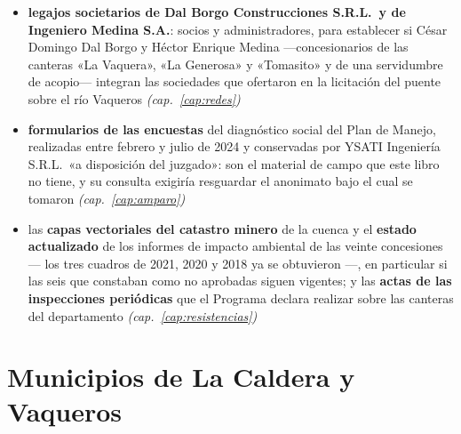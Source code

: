 \begin{itemize}[leftmargin=*]
\item \textbf{legajos societarios de Dal Borgo Construcciones S.R.L.\ y de Ingeniero Medina S.A.}: socios y administradores, para establecer si César Domingo Dal Borgo y Héctor Enrique Medina ---concesionarios de las canteras «La Vaquera», «La Generosa» y «Tomasito» y de una servidumbre de acopio--- integran las sociedades que ofertaron en la licitación del puente sobre el río Vaqueros \textit{(cap.\ \ref{cap:redes})}
\item \textbf{formularios de las encuestas} del diagnóstico social del Plan de Manejo, realizadas entre febrero y julio de 2024 y conservadas por YSATI Ingeniería S.R.L.\ «a disposición del juzgado»: son el material de campo que este libro no tiene, y su consulta exigiría resguardar el anonimato bajo el cual se tomaron \textit{(cap.\ \ref{cap:amparo})}
\item las \textbf{capas vectoriales del catastro minero} de la cuenca y el
\textbf{estado actualizado} de los informes de impacto ambiental de las veinte concesiones ---
los tres cuadros de 2021, 2020 y 2018 ya se obtuvieron ---, en particular si las seis que
constaban como no aprobadas siguen vigentes; y las \textbf{actas de las inspecciones
periódicas} que el Programa declara realizar sobre las canteras del departamento \textit{(cap.\ \ref{cap:resistencias})}
\end{itemize}

\section{Municipios de La Caldera y Vaqueros}

